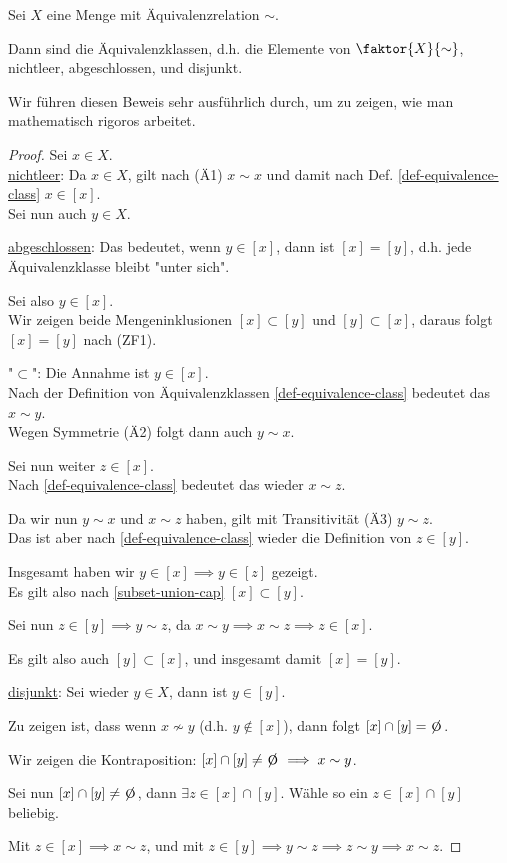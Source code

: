 \begin{lemma}
    Sei $X$ eine Menge mit Äquivalenzrelation $\sim$.
    
    Dann sind die Äquivalenzklassen, d.h. die Elemente von $\faktor{X}{\sim}$, nichtleer, abgeschlossen, und disjunkt.
\end{lemma}
Wir führen diesen Beweis sehr ausführlich durch, um zu zeigen, wie man mathematisch rigoros arbeitet.
\begin{proof}
    Sei $x \in X$.\\

    \underline{nichtleer}: Da $x \in X$, gilt nach (Ä1) $x \sim x$ und damit nach Def. \ref{def-equivalence-class} $x \in [x]$.
    \pushQED{\subqed}\popQED\\

    Sei nun auch $y \in X$.

    \underline{abgeschlossen}: Das bedeutet, wenn $y \in [x]$, dann ist $[x] = [y]$, d.h. jede Äquivalenzklasse bleibt "unter sich".

    Sei also $y \in [x]$.\\
    Wir zeigen beide Mengeninklusionen $[x] \subset [y]$ und $[y] \subset [x]$, daraus folgt $[x] = [y]$ nach (ZF1).

    "$\subset$": Die Annahme ist $y \in [x]$.\\
    Nach der Definition von Äquivalenzklassen \ref{def-equivalence-class} bedeutet das $x \sim y$.\\
    Wegen Symmetrie (Ä2) folgt dann auch $y \sim x$.

    Sei nun weiter $z \in [x]$.\\
    Nach \ref{def-equivalence-class} bedeutet das wieder $x \sim z$.
    
    Da wir nun $y \sim x$ und $x \sim z$ haben, gilt mit Transitivität (Ä3) $y \sim z$.\\
    Das ist aber nach \ref{def-equivalence-class} wieder die Definition von $z \in [y]$.
    
    Insgesamt haben wir $y \in [x] \implies y \in [z]$ gezeigt.\\
    Es gilt also nach \ref{subset-union-cap} $[x] \subset [y]$.

    Sei nun $z \in [y] \implies y \sim z$, da $x \sim y \implies x \sim z \implies z \in [x]$.
    
    Es gilt also auch $[y] \subset [x]$, und insgesamt damit $[x] = [y]$.
    \pushQED{\subqed}\popQED

    \underline{disjunkt}: Sei wieder $y \in X$, dann ist $y \in [y]$.

    Zu zeigen ist, dass wenn $x \nsim y$ (d.h. $y \notin [x]$), dann folgt $[x] \cap [y] = \e$.

    Wir zeigen die Kontraposition: $[x] \cap [y] \neq \e \implies x \sim y$.

    Sei nun $[x] \cap [y] \neq \e$, dann $\exists z \in [x] \cap [y]$. Wähle so ein $z \in [x] \cap [y]$ beliebig.

    Mit $z \in [x] \implies x \sim z$, und mit $z \in [y] \implies y \sim z \implies z \sim y \implies x \sim z$.
\end{proof}

